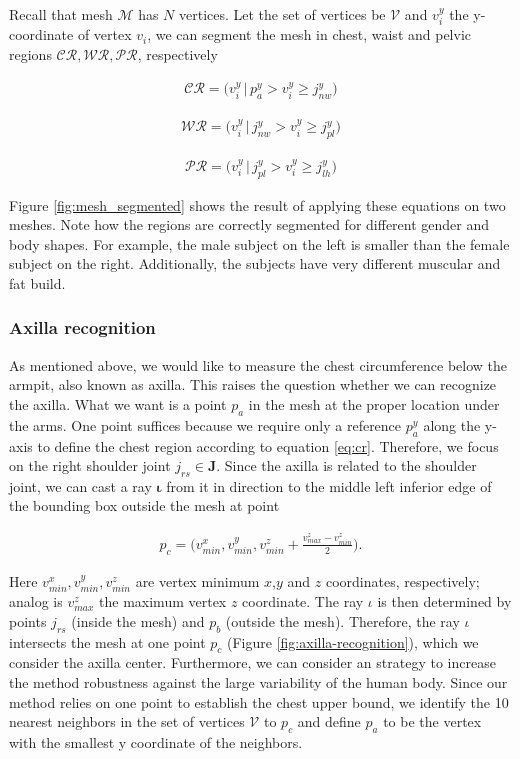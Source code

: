 \documentclass[runningheads, orivec]{llncs}
\begin{document}
Recall that mesh $\mathcal{M}$ has $N$ vertices. Let the set of vertices be 
$\mathcal{V}$ and $v^y_i$ the y-coordinate of vertex $v_i$, we can 
segment the 
mesh in chest, waist and pelvic regions 
$\mathcal{CR}, \mathcal{WR}, \mathcal{PR}$, respectively

\begin{align}\label{eq:cr}
\mathcal{CR} = \big(v^y_i \, | \, p^y_a > v^y_i \geq j^y_{nw} \big)
\end{align}

\begin{align}\label{eq:wr}
\mathcal{WR} = \big(v^y_i \, | \, j^y_{nw} > v^y_i \geq j^y_{pl}\big)
\end{align}

\begin{align}\label{eq:pr}
\mathcal{PR} = \big(v^y_i \, | \, j^y_{pl} > v^y_i \geq j^y_{lh}\big)
\end{align}

Figure \ref{fig:mesh_segmented} shows the result of applying these equations on 
two meshes. Note how the regions are correctly segmented for different gender 
and body shapes. For example, the male subject on the left is smaller than the 
female subject on the right. Additionally, the subjects have very different 
muscular and fat build.

\subsubsection{Axilla recognition}\label{subsec:armpit_recog}
As mentioned above, we would like to measure the chest circumference below the 
armpit, also known as axilla. This raises the question whether we can recognize 
the axilla. What we want is a point $p_a$ in the mesh at the proper location 
under 
the arms. One point suffices because we require only a reference $p^y_a$ along 
the 
y-axis to define the chest region according to equation \ref{eq:cr}. Therefore, 
we focus on the right shoulder joint $j_{rs} \in \mathbf{J}$. Since the axilla 
is related to 
the shoulder joint, we can cast a ray $\boldsymbol{\iota}$ from it in direction 
to the middle left 
inferior edge of the bounding box outside the mesh at point

\begin{align}
p_c = \bigg(v^x_{min}, v^y_{min}, v^z_{min} + 
\frac{v^z_{max} - v^z_{min}}{2}\bigg).
\end{align}

Here $v^x_{min}, v^y_{min}, v^z_{min}$ are vertex minimum $x$,$y$ and $z$ 
coordinates, respectively; analog is $v^z_{max}$ the maximum vertex $z$ 
coordinate. The ray 
$\iota$ is then determined by points $j_{rs}$ (inside the mesh) and $p_b$ 
(outside the mesh). Therefore, the ray $\iota$ intersects the mesh at one point 
$p_c$ (Figure \ref{fig:axilla-recognition}), which we consider the axilla 
center. Furthermore, we can consider an strategy to increase the method 
robustness against the large variability of the human body. Since our method 
relies on one point to establish the chest upper bound, we identify the 10 
nearest neighbors in the set of vertices $\mathcal{V}$ to $p_c$ and define 
$p_a$ to be the 
vertex with the smallest 
y coordinate of the neighbors.  
\end{document}
